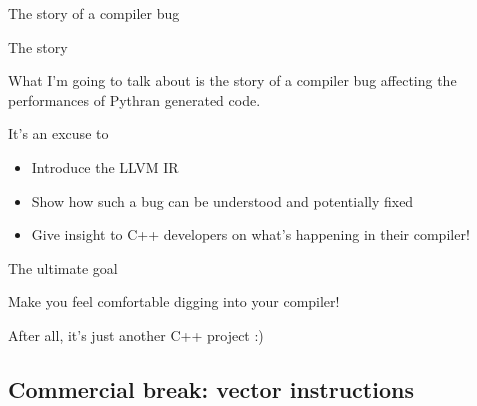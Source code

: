\begin{frame}{The story of a compiler bug}

  \begin{block}{The story}
    \begin{center}
      What I'm going to talk about is the story of a compiler bug affecting the
      performances of Pythran generated code.
    \end{center}
  \end{block}

  \pause

  \begin{block}{It's an excuse to}
    \begin{itemize}
      \item Introduce the LLVM IR
      \item Show how such a bug can be understood and potentially fixed
      \item Give insight to C++ developers on what's happening in their compiler!
    \end{itemize}
  \end{block}

  \pause

  \begin{alertblock}{The ultimate goal}
    \begin{center}
      Make you feel comfortable digging into your compiler!
    \end{center} 
    \pause
    \begin{center}
      After all, it's just another C++ project :)
    \end{center} 
  \end{alertblock}
\end{frame}

\subsection{Commercial break: vector instructions}

